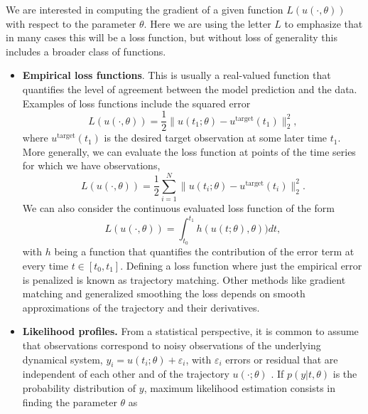 We are interested in computing the gradient of a given function $L(u(\cdot, \theta))$ with respect to the parameter $\theta$.
Here we are using the letter $L$ to emphasize that in many cases this will be a loss function, but without loss of generality this includes a broader class of functions. 
\begin{itemize}
    \item \textbf{Empirical loss functions}. This is usually a real-valued function that quantifies the level of agreement between the model prediction and the data. Examples of loss functions include the squared error
    \begin{equation}
         L(u(\cdot, \theta)) = \frac{1}{2} \| u(t_1; \theta) - u^{\text{target}}(t_1) \|_2^2,
         \label{eq:quadratic-loss-function}
    \end{equation}
    where $u^{\text{target}}(t_1)$ is the desired target observation at some later time $t_1$.
    More generally, we can evaluate the loss function at points of the time series for which we have observations, 
    \begin{equation}
        L(u(\cdot, \theta)) = \frac{1}{2} \sum_{i=1}^N \| u(t_i; \theta) - u^{\text{target}}(t_i) \|_2^2.
    \end{equation}
    We can also consider the continuous evaluated loss function of the form
    \begin{equation}
         L(u(\cdot, \theta)) = \int_{t_0}^{t_1} h( u(t;\theta), \theta) ) dt, 
    \end{equation}
    with $h$ being a function that quantifies the contribution of the error term at every time $t \in [t_0, t_1]$. 
    Defining a loss function where just the empirical error is penalized is known as trajectory matching. 
    Other methods like gradient matching and generalized smoothing the loss depends on smooth approximations of the trajectory and their derivatives. 
    \item \textbf{Likelihood profiles.} From a statistical perspective, it is common to assume that observations correspond to noisy observations of the underlying dynamical system, $y_i = u(t_i; \theta) + \varepsilon_i$, with $\varepsilon_i$ errors or residual that are independent of each other and of the trajectory $u(\cdot ; \theta)$ \cite{ramsay2017dynamic}.
    If $p(y | t , \theta)$ is the probability distribution of $y$, maximum likelihood estimation consists in finding the parameter $\theta$ as
    \begin{equation}

\end{equation}
\end{itemize}
